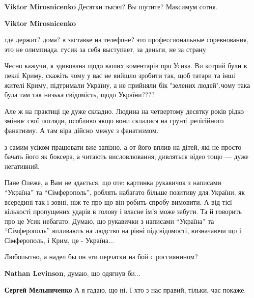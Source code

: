 \begin{itemize}
\begin{itemize} %
\textbf{Viktor Mirosnicenko} Десятки тысяч? Вы шутите? Максимум сотня.

\textbf{Viktor Mirosnicenko} 

где держит? дома? в заставке на телефоне? это профессиональные соревнования,
это не олимпиада. гусик за себя выступает, за деньги, не за страну

\end{itemize} %


Чесно кажучи, я здивована щодо ваших коментарів про Усика. Ви котрий були в
пеклі Криму, скажіть чому у вас не вийшло зробити так, щоб татари та інші жителі
Криму, підтримали Україну, а не прийняли бік "зелених людей",чому така була там
так низька свідомість, щодо України????



Але ж на практиці це дуже складно. Людина на четвертому десятку років рідко
змінює свої погляди, особливо якщо вони склалися на грунті релігійного
фанатизму. А там віра дійсно межує з фанатизмом.



з самим усіком працювати вже запізно. а от його вплив на дітей, які не просто
бачать його як боксера, а читають висловлювання, дивляться відео тощо — дуже
негативний.


Пане Олеже, а Вам не здається, що оте: картинка рукавичок з написами
\enquote{Україна} та \enquote{Сімферополь}, роблять набагато більше позитиву
для України, як всередині так і зовні, ніж те про що він робить спробу
вимовити. А від тієї кількості пропущених ударів в голову і власне ім'я може
забути. Та й говорить про це Усик небагато. Думаю, що рукавички з написами
\enquote{Україна} та \enquote{Сімферополь} впливають на людство на рівні
підсвідомості, визначаючи що і Сімферополь, і Крим, це - Україна...

\begin{itemize} %
Любопытно, а надел бы он эти перчатки на бой с россиянином?

\textbf{Nathan Levinson}, думаю, що одягнув би...

\textbf{Сергей Мельниченко} А я гадаю, що ні. І хто з нас правий, тільки, час покаже.



\end{itemize}
\end{itemize}
